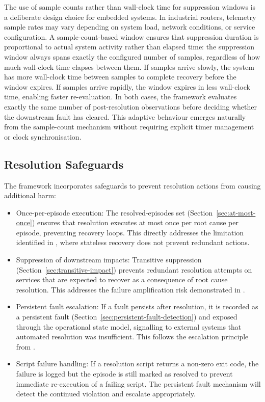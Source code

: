 The use of sample counts rather than wall-clock time for suppression windows is a deliberate design choice for embedded systems. In industrial routers, telemetry sample rates may vary depending on system load, network conditions, or service configuration.  A sample-count-based window ensures that suppression duration is proportional to actual system activity rather than elapsed time: the suppression window always spans exactly the configured number of samples, regardless of how much wall-clock time elapses between them. If samples arrive slowly, the system has more wall-clock time between samples to complete recovery before the window expires. If samples arrive rapidly, the window expires in less wall-clock time, enabling faster re-evaluation. In both cases, the framework evaluates exactly the same number of post-resolution observations before deciding whether the downstream fault has cleared. This adaptive behaviour emerges naturally from the sample-count mechanism without requiring explicit timer management or clock synchronisation.

\subsection{Resolution Safeguards}\label{sec:resolution-safeguards}

The framework incorporates safeguards to prevent resolution actions from causing additional harm:

\begin{itemize}
\item Once-per-episode execution: The resolved-episodes set (Section~\ref{sec:at-most-once}) ensures that resolution executes at most once per root cause per episode, preventing recovery loops. This directly addresses the limitation identified in \cite{ref20}, where stateless recovery does not prevent redundant actions.
\item Suppression of downstream impacts: Transitive suppression (Section~\ref{sec:transitive-impact}) prevents redundant resolution attempts on services that are expected to recover as a consequence of root cause resolution. This addresses the failure amplification risk demonstrated in \cite{ref16}.
\item Persistent fault escalation: If a fault persists after resolution, it is recorded as a persistent fault (Section~\ref{sec:persistent-fault-detection}) and exposed through the operational state model, signalling to external systems that automated resolution was insufficient. This follows the escalation principle from \cite{ref2}.
\item Script failure handling: If a resolution script returns a non-zero exit code, the failure is logged but the episode is still marked as resolved to prevent immediate re-execution of a failing script. The persistent fault mechanism will detect the continued violation and escalate appropriately.
\end{itemize}

